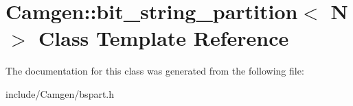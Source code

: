 \hypertarget{a00030}{\section{Camgen\-:\-:bit\-\_\-string\-\_\-partition$<$ N $>$ Class Template Reference}
\label{a00030}
}


The documentation for this class was generated from the following file\-:\begin{DoxyCompactItemize}
\item 
include/\-Camgen/bspart.\-h\end{DoxyCompactItemize}
